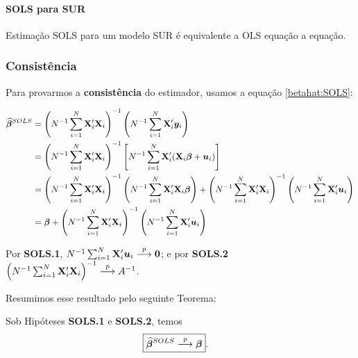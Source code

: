\documentclass[11pt, oneside, a4paper, article]{article}
\numberwithin{equation}{section}
\begin{document}
\paragraph{SOLS para SUR} Estimação SOLS para um modelo SUR é equivalente a OLS equação a equação.

\subsubsection{Consistência}

Para provarmos a \textbf{consistência} do estimador, usamos a equação \eqref{betahat:SOLS}:

\vspace{-1 em}
\begin{align*}
\widehat{\boldsymbol{\beta}}^{SOLS} &=
\left( N^{-1}\sum_{i=1}^{N} \mathbf{X}_{i}' \mathbf{X}_{i}   \right)^{-1}
\left( N^{-1}\sum_{i=1}^{N} \mathbf{X}_{i}' \boldsymbol{y}_{i}   \right)
\\ &=
\left( N^{-1}\sum_{i=1}^{N} \mathbf{X}_{i}' \mathbf{X}_{i}   \right)^{-1}
\left[ N^{-1}\sum_{i=1}^{N} \mathbf{X}_{i}' (\mathbf{X}_{i} \boldsymbol{\beta} + \boldsymbol{u}_{i})   \right]
\\ &=
\left( N^{-1}\sum_{i=1}^{N} \mathbf{X}_{i}' \mathbf{X}_{i}   \right)^{-1}
\left( N^{-1}\sum_{i=1}^{N} \mathbf{X}_{i}' \mathbf{X}_{i} \boldsymbol{\beta}    \right)
+
\left( N^{-1}\sum_{i=1}^{N} \mathbf{X}_{i}' \mathbf{X}_{i}   \right)^{-1}
\left( N^{-1}\sum_{i=1}^{N} \mathbf{X}_{i}' \boldsymbol{u}_{i}   \right)
\\ &=
\boldsymbol{\beta}
+
\left( N^{-1}\sum_{i=1}^{N} \mathbf{X}_{i}' \mathbf{X}_{i}   \right)^{-1}
\left( N^{-1}\sum_{i=1}^{N} \mathbf{X}_{i}' \boldsymbol{u}_{i}   \right)
\end{align*}

Por \textbf{SOLS.1},
$N^{-1} \sum_{i=1}^{N} \mathbf{X}_{i}' \boldsymbol{u}_{i}  \overset{p}{\longrightarrow}  \boldsymbol{0}$;
e por \textbf{SOLS.2}
$\left( N^{-1} \sum_{i=1}^{N} \mathbf{X}_{i}' \mathbf{X}_{i} \right)^{-1}  \overset{p}{\longrightarrow}  A^{-1}$.

Resumimos esse resultado pelo seguinte Teorema:

\begin{teo1}\label{SOLS:const}
Sob Hipóteses \textbf{SOLS.1} e \textbf{SOLS.2}, temos 
\begin{align*}
\Aboxed{
	\betahatbold^{SOLS} \arrowp \betavec
}.
\end{align*}
\end{teo1}
\end{document}
